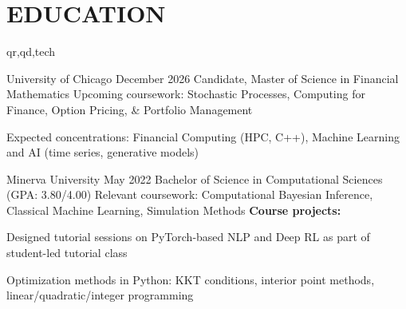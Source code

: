 \section{EDUCATION}
\begin{rolecontent}{qr,qd,tech}
\begin{education_xp}[Chicago, IL]
                   {University of Chicago}
                   {December 2026}
                   {Candidate, Master of Science in Financial Mathematics}
    Upcoming coursework: Stochastic Processes, Computing for Finance, Option Pricing, \& Portfolio Management
    \begin{highlights}
        \item Expected concentrations: Financial Computing (HPC, C++), Machine Learning and AI (time series, generative models)
    \end{highlights}
\end{education_xp}
\end{rolecontent}
\vspace{0.1 cm}
\begin{education_xp}
                   {Minerva University}
                   {May 2022}
                   {Bachelor of Science in Computational Sciences (GPA: 3.80/4.00)}
    Relevant coursework: Computational Bayesian Inference, Classical Machine Learning, Simulation Methods\newline
    \textbf{Course projects:}
    \begin{highlights}
        \item Designed tutorial sessions on PyTorch-based NLP and Deep RL as part of student-led tutorial class
        \item Optimization methods in Python: KKT conditions, interior point methods, linear/quadratic/integer programming
    \end{highlights}
\end{education_xp}
